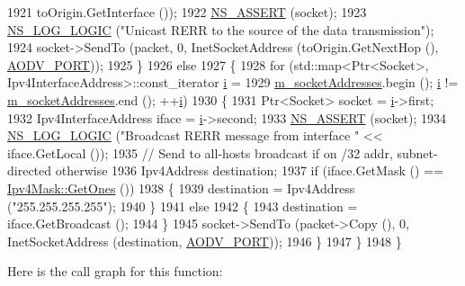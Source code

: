 \begin{DoxyCode}
1921           toOrigin.GetInterface ());
1922       \hyperlink{assert_8h_a6dccdb0de9b252f60088ce281c49d052}{NS\_ASSERT} (socket);
1923       \hyperlink{group__logging_ga88acd260151caf2db9c0fc84997f45ce}{NS\_LOG\_LOGIC} (\textcolor{stringliteral}{"Unicast RERR to the source of the data transmission"});
1924       socket->SendTo (packet, 0, InetSocketAddress (toOrigin.GetNextHop (), 
      \hyperlink{classns3_1_1aodv_1_1RoutingProtocol_ac4a3de99b49ad5f6efc9b71a700f7ec4}{AODV\_PORT}));
1925     \}
1926   \textcolor{keywordflow}{else}
1927     \{
1928       \textcolor{keywordflow}{for} (std::map<Ptr<Socket>, Ipv4InterfaceAddress>::const\_iterator \hyperlink{bernuolliDistribution_8m_a6f6ccfcf58b31cb6412107d9d5281426}{i} =
1929              \hyperlink{classns3_1_1aodv_1_1RoutingProtocol_aa3263563cbbd735faafbf17fd4e28a10}{m\_socketAddresses}.begin (); \hyperlink{bernuolliDistribution_8m_a6f6ccfcf58b31cb6412107d9d5281426}{i} != 
      \hyperlink{classns3_1_1aodv_1_1RoutingProtocol_aa3263563cbbd735faafbf17fd4e28a10}{m\_socketAddresses}.end (); ++\hyperlink{bernuolliDistribution_8m_a6f6ccfcf58b31cb6412107d9d5281426}{i})
1930         \{
1931           Ptr<Socket> socket = \hyperlink{bernuolliDistribution_8m_a6f6ccfcf58b31cb6412107d9d5281426}{i}->first;
1932           Ipv4InterfaceAddress iface = \hyperlink{bernuolliDistribution_8m_a6f6ccfcf58b31cb6412107d9d5281426}{i}->second;
1933           \hyperlink{assert_8h_a6dccdb0de9b252f60088ce281c49d052}{NS\_ASSERT} (socket);
1934           \hyperlink{group__logging_ga88acd260151caf2db9c0fc84997f45ce}{NS\_LOG\_LOGIC} (\textcolor{stringliteral}{"Broadcast RERR message from interface "} << iface.GetLocal ());
1935           \textcolor{comment}{// Send to all-hosts broadcast if on /32 addr, subnet-directed otherwise}
1936           Ipv4Address destination;
1937           \textcolor{keywordflow}{if} (iface.GetMask () == \hyperlink{classns3_1_1Ipv4Mask_af712cbdf28c039025d4aa45fa7e243dd}{Ipv4Mask::GetOnes} ())
1938             \{
1939               destination = Ipv4Address (\textcolor{stringliteral}{"255.255.255.255"});
1940             \}
1941           \textcolor{keywordflow}{else}
1942             \{ 
1943               destination = iface.GetBroadcast ();
1944             \}
1945           socket->SendTo (packet->Copy (), 0, InetSocketAddress (destination, 
      \hyperlink{classns3_1_1aodv_1_1RoutingProtocol_ac4a3de99b49ad5f6efc9b71a700f7ec4}{AODV\_PORT}));
1946         \}
1947     \}
1948 \}
\end{DoxyCode}


Here is the call graph for this function\+:




